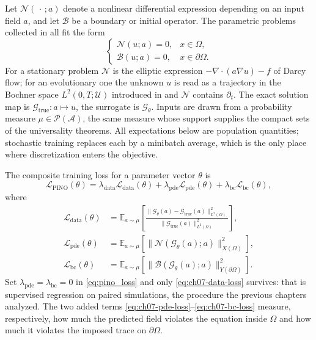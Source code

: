Let $\mathcal{N}(\,\cdot\,;a)$
denote a nonlinear differential expression depending on an input field $a$, and let
$\mathcal{B}$ be a boundary or initial
operator. The parametric problems collected in
 all fit the form
\begin{equation}
  \label{eq:ch07-bvp}
  \begin{cases}
    \mathcal{N}(u; a) = 0, & x \in \Omega, \\
    \mathcal{B}(u; a) = 0, & x \in \partial\Omega.
  \end{cases}
\end{equation}
For a stationary problem $\mathcal{N}$ is the elliptic expression $-\nabla\cdot(a\nabla u)-f$
of Darcy flow; for an evolutionary one the unknown $u$ is read as a trajectory in the
Bochner space $L^2(0,T;\mathcal{U})$ introduced in
 and $\mathcal{N}$ contains
$\partial_t$. The exact solution map is $\mathcal{G}_{\text{true}}:a\mapsto u$, the surrogate
is $\mathcal{G}_\theta$. Inputs are drawn from a probability measure
$\mu\in\mathcal{P}(\mathcal{A})$, the same measure whose
support supplies the compact sets of the universality
theorems. All expectations below are population quantities; stochastic training replaces
each by a minibatch average, which is the only place where discretization enters the
objective.

The composite training loss for a parameter vector $\theta$ is
\begin{equation}
  \label{eq:pino_loss}
  \mathcal{L}_{\text{PINO}}(\theta) = \lambda_{\text{data}} \mathcal{L}_{\text{data}}(\theta) + \lambda_{\text{pde}} \mathcal{L}_{\text{pde}}(\theta) + \lambda_{\text{bc}} \mathcal{L}_{\text{bc}}(\theta),
\end{equation}
where
\begin{align}
  \mathcal{L}_{\text{data}}(\theta) &= \mathbb{E}_{a \sim \mu} \left[ \frac{\|\mathcal{G}_\theta(a) - \mathcal{G}_{\text{true}}(a)\|_{L^2(\Omega)}^2}{\|\mathcal{G}_{\text{true}}(a)\|_{L^2(\Omega)}^2} \right], \label{eq:ch07-data-loss}\\
  \mathcal{L}_{\text{pde}}(\theta) &= \mathbb{E}_{a \sim \mu} \left[ \|\mathcal{N}(\mathcal{G}_\theta(a); a)\|_{X(\Omega)}^2 \right], \label{eq:ch07-pde-loss}\\
  \mathcal{L}_{\text{bc}}(\theta) &= \mathbb{E}_{a \sim \mu} \left[ \|\mathcal{B}(\mathcal{G}_\theta(a); a)\|_{Y(\partial\Omega)}^2 \right]. \label{eq:ch07-bc-loss}
\end{align}
Set $\lambda_{\text{pde}}=\lambda_{\text{bc}}=0$ in \eqref{eq:pino_loss} and only
\eqref{eq:ch07-data-loss} survives: that is supervised regression on paired simulations, the
procedure the previous chapters analyzed. The two added terms
\eqref{eq:ch07-pde-loss}--\eqref{eq:ch07-bc-loss} measure, respectively, how much the
predicted field violates the equation inside $\Omega$ and how much it violates the imposed
trace on $\partial\Omega$.

